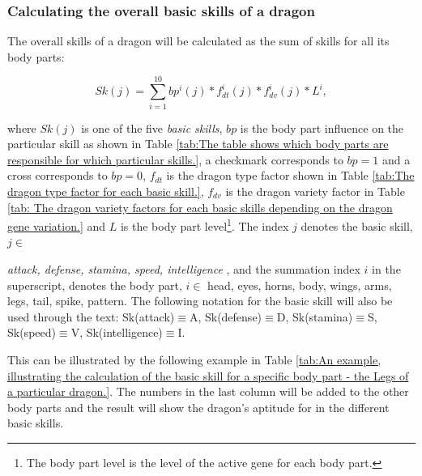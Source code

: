 \documentclass[12pt]{article}
\begin{document}
\vspace{\baselineskip}
 \subsubsection{Calculating the overall basic skills of a dragon}\label{Calculating the overall basic skills of a dragon}  \par

The overall skills of a dragon will be calculated as the sum of skills for all its body parts:
\begin{center}
   \begin{equation}
   \label{Eq:Sk}
      Sk(j) = \sum_{i=1}^{10} bp^i(j)*f_{dt}^i(j)*f_{dv}^i(j)*L^i,
   \end{equation}
\end{center}
where  $Sk(j)$  is one of the five \textit{basic skills}, $bp$  is the body part influence on the particular skill as shown in  Table \ref{tab:The table shows which body parts are responsible for which particular skills.}, a checkmark corresponds to $bp=1$ and a cross corresponds to $bp=0$,   $f_{dt}$  is the dragon type factor shown in  Table \ref{tab:The dragon type factor for each basic skill.},  $f_{dv}$  is the dragon variety factor in  Table \ref{tab: The dragon variety factors for each basic skills depending on the dragon gene variation.} and $L$ is the body part level\footnote{The body part level is the level of the active gene for each body part.}. The index  $j$ denotes the basic skill,  $j \in$ {\textit{attack, defense, stamina, speed, intelligence} , and the summation index $i$  in the superscript, denotes the body part,  $i \in$ {head, eyes, horns, body, wings, arms, legs, tail, spike, pattern}. The following notation for the basic skill will also be used through the text: Sk(attack)$\equiv$A, Sk(defense)$\equiv$D, Sk(stamina)$\equiv$S, Sk(speed)$\equiv$V, Sk(intelligence)$\equiv$I.\par 

This can be illustrated by the following example in  Table \ref{tab:An example, illustrating the calculation of the basic skill for a specific body part - the Legs of a particular dragon.}.  The numbers in the last column will be added to the other body parts and the result will show the dragon’s aptitude for in the different basic skills.

}
\end{document}
